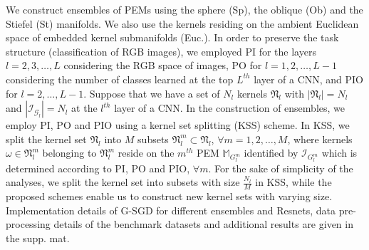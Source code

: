 \documentclass[10pt,journal,compsoc]{IEEEtran}
\theoremstyle{definition}
\theoremstyle{definition}
\theoremstyle{remark}
\theoremstyle{remark}
\theoremstyle{remark}
\begin{document}
We construct ensembles of PEMs using the sphere (Sp), the oblique (Ob) and the Stiefel (St) manifolds. We also use the kernels residing on the ambient Euclidean space of embedded kernel submanifolds (Euc.). In order to preserve the task structure (classification of RGB images), we employed PI for the layers $l=2,3,\ldots,L$ considering the RGB space of images, PO for  $l=1,2,\ldots,L-1$ considering the number of classes learned at the top $L^{th}$ layer of a CNN, and PIO for $l=2,\ldots,L-1$. Suppose that we have a set of $N_l$ kernels $\mathfrak{N}_l$ with $|\mathfrak{N}_l| = N_l$ and $|\mathcal{I}_{\mathcal{G}_l}| = N_l$ at the $l^{th}$ layer of a CNN. In the construction of ensembles, we employ PI, PO and PIO using a kernel set splitting (KSS) scheme. In KSS, we split the kernel set $\mathfrak{N}_l$ into $M$ subsets ${\mathfrak{N}_l^m \subset \mathfrak{N}_l}$, $ \forall m=1,2,\ldots,M$, where kernels ${\omega \in \mathfrak{N}^m_l}$ belonging to $\mathfrak{N}_l^m$ reside on the $m^{th}$ PEM $\mathbb{M}_{G^m_l}$ identified by $\mathcal{I}_{G^m_l}$ which is determined according to PI, PO and PIO, $\forall m$. For the sake of simplicity of the analyses, we split the kernel set into  subsets with size $\frac{N_l}{M}$ in KSS, while the proposed schemes enable us to construct new kernel sets with varying size. Implementation details of G-SGD for different ensembles and Resnets, data pre-processing details of the benchmark datasets and additional results are given in the supp. mat.
\end{document}
